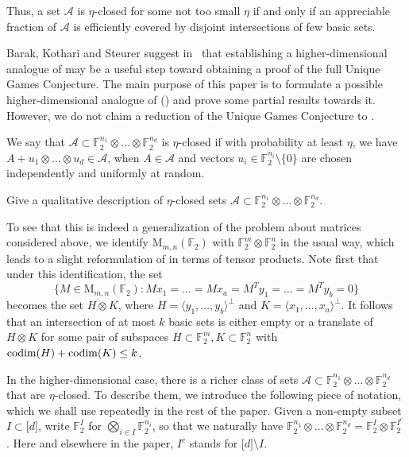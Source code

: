 \documentclass{toc}
\newcommand\F{\mathbb{F}}
\newcommand \cA{\mathcal A}
\newcommand \codim{{\rm codim}}
\newcommand \mn{\mathrm{M}_{m,n}(\F_2)}
\newcommand \s{\subset}
\begin{document}
Thus, a set $\cA$ is $\eta$-closed for some not too small $\eta$ if and only if an appreciable fraction of $\cA$ is efficiently covered by disjoint intersections of few basic sets.

\medskip
%
Barak, Kothari and Steurer suggest in~\cite{barak} that establishing
a higher-dimensional analogue of  may be a
useful step toward obtaining a proof of the full Unique Games Conjecture.
%
The main purpose of this paper is to formulate a possible
higher-dimensional analogue of 
() 
%
and prove some partial results towards it.
However, we do not claim a reduction of the Unique Games Conjecture
to .

We say that $\cA\s \F_2^{n_1}\otimes \dots \otimes \F_2^{n_d}$ is $\eta$-closed if with probability at least $\eta$, we have $A+u_1\otimes \dots \otimes u_d\in \cA$, when $A\in \cA$ and vectors $u_i\in \F_2^{n_i}\setminus \{0\}$ are chosen independently and uniformly at random. 

\begin{problem} \label{tensorproblem}
	Give a qualitative description of $\eta$-closed sets $\cA\s \F_2^{n_1}\otimes \dots \otimes \F_2^{n_d}$.
\end{problem}

To see that this is indeed a generalization of the problem about matrices considered above, we identify $\mn$ with $\F_2^m \otimes \F_2^n$ in the usual way, which leads to a slight reformulation of  in terms of tensor products. Note first that under this identification, the set
\[
  \{M\in \mn:Mx_1=\dots=Mx_a=M^Ty_1=\dots=M^Ty_b=0\}
\]
becomes the set $H\otimes K$, where $H=\langle y_1,\dots,y_b\rangle^{\perp}$ and $K=\langle x_1,\dots,x_a\rangle^{\perp}$. It follows that an intersection of at most $k$ basic sets is either empty or a translate of $H\otimes K$ for some pair of subspaces $H\s \F_2^m,K\s \F_2^n$ with $\codim(H)+\codim(K)\leq k$.

In the higher-dimensional case, there is a richer class of sets $\cA\s \F_2^{n_1}\otimes \dots \otimes \F_2^{n_d}$ that are $\eta$-closed. To describe them, we introduce the following piece of notation, which we shall use repeatedly in the rest of the paper. Given a non-empty subset $I\s \lbrack d\rbrack$, write $\F_2^{I}$ for $\bigotimes_{i\in I} \F_2^{n_i}$, so that we naturally have $\F_2^{n_1}\otimes \dots \otimes \F_2^{n_d}=\F_2^{I}\otimes \F_2^{I^c}$. Here and elsewhere in the paper, $I^c$ stands for $\lbrack d\rbrack \setminus I$.
\end{document}
